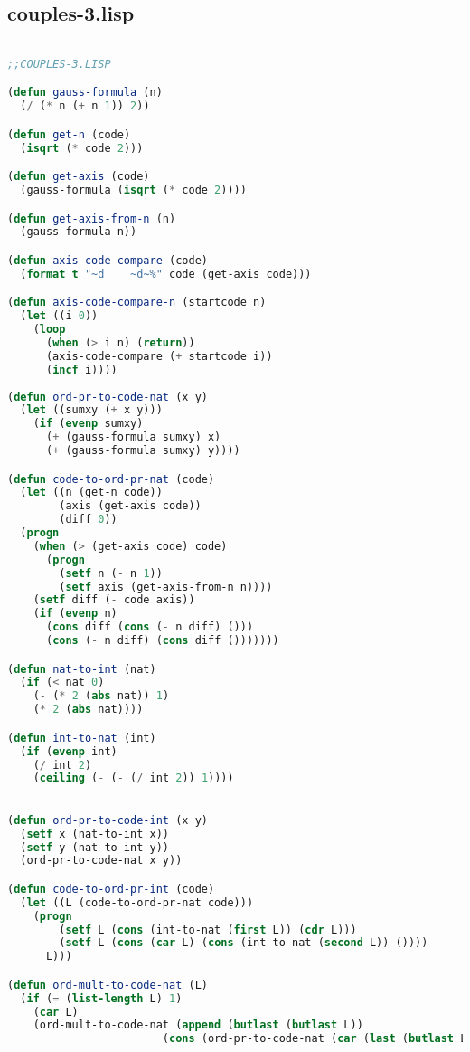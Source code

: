 \documentclass{article}
\begin{document}
\subsection{couples-3.lisp}
\label{couples3lisp}
\begin{lstlisting}[language=Lisp]

;;COUPLES-3.LISP

(defun gauss-formula (n)
  (/ (* n (+ n 1)) 2))

(defun get-n (code)
  (isqrt (* code 2)))

(defun get-axis (code)
  (gauss-formula (isqrt (* code 2))))

(defun get-axis-from-n (n)
  (gauss-formula n))

(defun axis-code-compare (code)
  (format t "~d    ~d~%" code (get-axis code))) 

(defun axis-code-compare-n (startcode n)
  (let ((i 0))
    (loop
      (when (> i n) (return))
      (axis-code-compare (+ startcode i))
      (incf i))))
  
(defun ord-pr-to-code-nat (x y)
  (let ((sumxy (+ x y)))
    (if (evenp sumxy)
      (+ (gauss-formula sumxy) x)
      (+ (gauss-formula sumxy) y))))

(defun code-to-ord-pr-nat (code)
  (let ((n (get-n code))
        (axis (get-axis code))
        (diff 0))
  (progn
    (when (> (get-axis code) code)
      (progn
        (setf n (- n 1))
        (setf axis (get-axis-from-n n))))
    (setf diff (- code axis))
    (if (evenp n)
      (cons diff (cons (- n diff) ()))
      (cons (- n diff) (cons diff ()))))))

(defun nat-to-int (nat)
  (if (< nat 0)
    (- (* 2 (abs nat)) 1)
    (* 2 (abs nat))))

(defun int-to-nat (int)
  (if (evenp int)
    (/ int 2) 
    (ceiling (- (- (/ int 2)) 1))))
    

(defun ord-pr-to-code-int (x y)
  (setf x (nat-to-int x))
  (setf y (nat-to-int y))
  (ord-pr-to-code-nat x y))

(defun code-to-ord-pr-int (code)
  (let ((L (code-to-ord-pr-nat code)))
    (progn
        (setf L (cons (int-to-nat (first L)) (cdr L)))
        (setf L (cons (car L) (cons (int-to-nat (second L)) ())))
      L)))  

(defun ord-mult-to-code-nat (L)
  (if (= (list-length L) 1)
    (car L)
    (ord-mult-to-code-nat (append (butlast (butlast L)) 
                        (cons (ord-pr-to-code-nat (car (last (butlast L))) (car (last L))) ())))))


\end{lstlisting}
\end{document}
